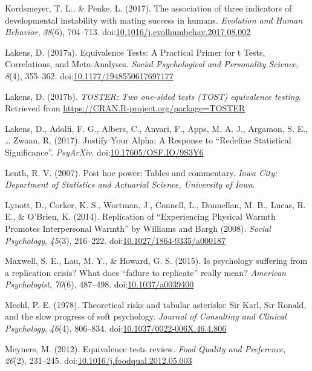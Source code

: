 \documentclass[english,floatsintext,man]{apa6}
\theoremstyle{definition}
\theoremstyle{definition}
\theoremstyle{definition}
\theoremstyle{remark}
\begin{document}
\hypertarget{ref-Kordsmeyer2017}{}
Kordsmeyer, T. L., \& Penke, L. (2017). The association of three
indicators of developmental instability with mating success in humans.
\emph{Evolution and Human Behavior}, \emph{38}(6), 704--713.
doi:\href{https://doi.org/10.1016/j.evolhumbehav.2017.08.002}{10.1016/j.evolhumbehav.2017.08.002}

\hypertarget{ref-Lakens2017a}{}
Lakens, D. (2017a). Equivalence Tests: A Practical Primer for t Tests,
Correlations, and Meta-Analyses. \emph{Social Psychological and
Personality Science}, \emph{8}(4), 355--362.
doi:\href{https://doi.org/10.1177/1948550617697177}{10.1177/1948550617697177}

\hypertarget{ref-R-TOSTER}{}
Lakens, D. (2017b). \emph{TOSTER: Two one-sided tests (TOST) equivalence
testing}. Retrieved from \url{https://CRAN.R-project.org/package=TOSTER}

\hypertarget{ref-Lakens2017b}{}
Lakens, D., Adolfi, F. G., Albers, C., Anvari, F., Apps, M. A. J.,
Argamon, S. E., \ldots{} Zwaan, R. (2017). Justify Your Alpha: A
Response to ``Redefine Statistical Significance''. \emph{PsyArXiv}.
doi:\href{https://doi.org/10.17605/OSF.IO/9S3Y6}{10.17605/OSF.IO/9S3Y6}

\hypertarget{ref-Lenth2007}{}
Lenth, R. V. (2007). Post hoc power: Tables and commentary. \emph{Iowa
City: Department of Statistics and Actuarial Science, University of
Iowa}.

\hypertarget{ref-Lynott2014}{}
Lynott, D., Corker, K. S., Wortman, J., Connell, L., Donnellan, M. B.,
Lucas, R. E., \& O'Brien, K. (2014). Replication of ``Experiencing
Physical Warmth Promotes Interpersonal Warmth'' by Williams and Bargh
(2008). \emph{Social Psychology}, \emph{45}(3), 216--222.
doi:\href{https://doi.org/10.1027/1864-9335/a000187}{10.1027/1864-9335/a000187}

\hypertarget{ref-Maxwell2015}{}
Maxwell, S. E., Lau, M. Y., \& Howard, G. S. (2015). Is psychology
suffering from a replication crisis? What does ``failure to replicate''
really mean? \emph{American Psychologist}, \emph{70}(6), 487--498.
doi:\href{https://doi.org/10.1037/a0039400}{10.1037/a0039400}

\hypertarget{ref-Meehl1978}{}
Meehl, P. E. (1978). Theoretical risks and tabular asterisks: Sir Karl,
Sir Ronald, and the slow progress of soft psychology. \emph{Journal of
Consulting and Clinical Psychology}, \emph{46}(4), 806--834.
doi:\href{https://doi.org/10.1037/0022-006X.46.4.806}{10.1037/0022-006X.46.4.806}

\hypertarget{ref-Meyners2012}{}
Meyners, M. (2012). Equivalence tests review. \emph{Food Quality and
Preference}, \emph{26}(2), 231--245.
doi:\href{https://doi.org/10.1016/j.foodqual.2012.05.003}{10.1016/j.foodqual.2012.05.003}
\end{document}
